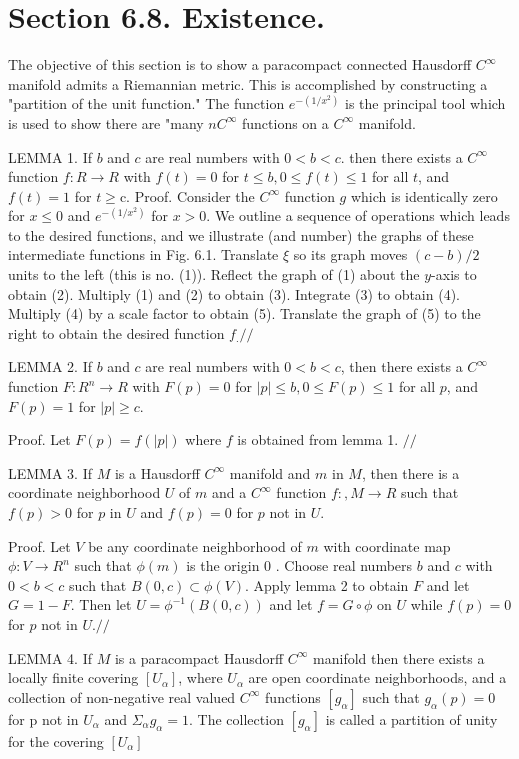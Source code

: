 \documentclass[10pt]{article}
\begin{document}
\section{Section 6.8. Existence.}
The objective of this section is to show a paracompact connected Hausdorff $C^{\infty}$ manifold admits a Riemannian metric. This is accomplished by constructing a "partition of the unit function." The function $e^{-\left(1 / x^{2}\right)}$ is the principal tool which is used to show there are "many $n C^{\infty}$ functions on a $C^{\infty}$ manifold.

LEMMA 1. If $b$ and $c$ are real numbers with $0<b<c$. then there exists a $C^{\infty}$ function $f: R \rightarrow R$ with $f(t)=0$ for $t \leq b, 0 \leq f(t) \leq 1$ for all $t$, and $f(t)=1$ for $t \geq \mathrm{c}$. Proof. Consider the $C^{\infty}$ function $g$ which is identically zero for $x \leq 0$ and $e^{-\left(1 / x^{2}\right)}$ for $x>0$. We outline a sequence of operations which leads to the desired functions, and we illustrate (and number) the graphs of these intermediate functions in Fig. 6.1. Translate $\xi$ so its graph moves $(c-b) / 2$ units to the left (this is no. (1)). Reflect the graph of (1) about the $y$-axis to obtain (2). Multiply (1) and (2) to obtain (3). Integrate (3) to obtain (4). Multiply (4) by a scale factor to obtain (5). Translate the graph of (5) to the right to obtain the desired function $f_{.} / /$

LEMMA 2. If $b$ and $c$ are real numbers with $0<b<c$, then there exists a $C^{\infty}$ function $F: R^{n} \rightarrow R$ with $F(p)=0$ for $|p| \leq b, 0 \leq F(p) \leq 1$ for all $p$, and $F(p)=1$ for $|p| \geq c$.

Proof. Let $F(p)=f(|p|)$ where $f$ is obtained from lemma 1. $/ /$

LEMMA 3. If $M$ is a Hausdorff $C^{\infty}$ manifold and $m$ in $M$, then there is a coordinate neighborhood $U$ of $m$ and a $C^{\infty}$ function $f:, M \rightarrow R$ such that $f(p)>0$ for $p$ in $U$ and $f(p)=0$ for $p$ not in $U$.

Proof. Let $V$ be any coordinate neighborhood of $m$ with coordinate map $\phi: V \rightarrow R^{n}$ such that $\phi(m)$ is the origin 0 . Choose real numbers $b$ and $c$ with $0<b<c$ such that $B(0, c) \subset \phi(V)$. Apply lemma 2 to obtain $F$ and let $G=1-F$. Then let $U=\phi^{-1}(B(0, c))$ and let $f=G \circ \phi$ on $U$ while $f(p)=0$ for $p$ not in $U . / /$

LEMMA 4. If $M$ is a paracompact Hausdorff $C^{\infty}$ manifold then there exists a locally finite covering $\left[U_{\alpha}\right]$, where $U_{\alpha}$ are open coordinate neighborhoods, and a collection of non-negative real valued $C^{\infty}$ functions $\left[g_{\alpha}\right]$ such that $g_{\alpha}(p)=0$ for p not in $U_{\alpha}$ and $\Sigma_{\alpha} g_{\alpha}=1$. The collection $\left[g_{\alpha}\right]$ is called a partition of unity for the covering $\left[U_{\alpha}\right]$
\end{document}
